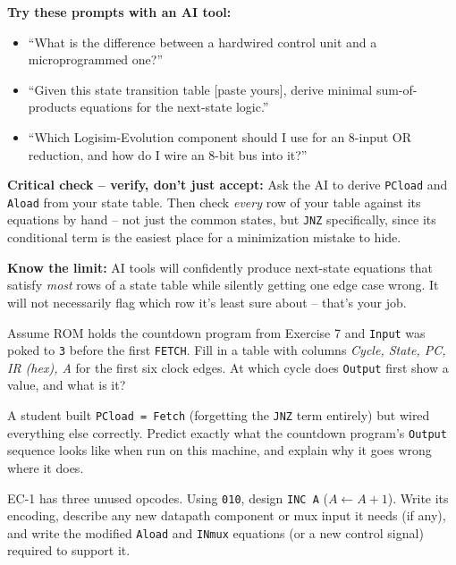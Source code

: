 \documentclass[11pt]{article}
\begin{document}
\begin{aicollab}
\textbf{Try these prompts with an AI tool:}
\begin{itemize}[leftmargin=*,nosep]
  \item ``What is the difference between a hardwired control unit and a
        microprogrammed one?''
  \item ``Given this state transition table [paste yours], derive minimal
        sum-of-products equations for the next-state logic.''
  \item ``Which Logisim-Evolution component should I use for an 8-input OR
        reduction, and how do I wire an 8-bit bus into it?''
\end{itemize}

\medskip\textbf{Critical check -- verify, don't just accept:}
Ask the AI to derive \texttt{PCload} and \texttt{Aload} from your state table.
Then check \emph{every} row of your table against its equations by hand -- not
just the common states, but \texttt{JNZ} specifically, since its conditional term
is the easiest place for a minimization mistake to hide.

\medskip\textbf{Know the limit:}
AI tools will confidently produce next-state equations that satisfy \emph{most}
rows of a state table while silently getting one edge case wrong. It will not
necessarily flag which row it's least sure about -- that's your job.
\end{aicollab}

\takehomebanner

\begin{trace}
Assume ROM holds the countdown program from Exercise 7 and \texttt{Input} was
poked to \texttt{3} before the first \texttt{FETCH}. Fill in a table with columns
\emph{Cycle, State, PC, IR (hex), A} for the first six clock edges. At which cycle
does \texttt{Output} first show a value, and what is it?
\end{trace}

\begin{bug}
A student built \texttt{PCload = Fetch} (forgetting the \texttt{JNZ} term
entirely) but wired everything else correctly. Predict exactly what the
countdown program's \texttt{Output} sequence looks like when run on this
machine, and explain why it goes wrong where it does.
\end{bug}

\begin{writecode}
EC-1 has three unused opcodes. Using \texttt{010}, design \texttt{INC A}
($A \leftarrow A+1$). Write its encoding, describe any new datapath component or
mux input it needs (if any), and write the modified \texttt{Aload} and
\texttt{INmux} equations (or a new control signal) required to support it.
\end{writecode}
\end{document}
